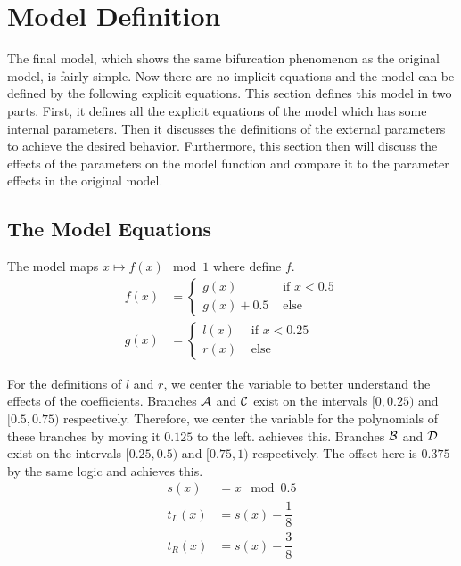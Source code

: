 \section{Model Definition}

The final model, which shows the same bifurcation phenomenon as the original model, is fairly simple.
Now there are no implicit equations and the model can be defined by the following explicit equations.
This section defines this model in two parts.
First, it defines all the explicit equations of the model which has some internal parameters.
Then it discusses the definitions of the external parameters to achieve the desired behavior.
Furthermore, this section then will discuss the effects of the parameters on the model function and compare it to the parameter effects in the original model.

\subsection{The Model Equations}

The model maps $x \mapsto f(x) \mod 1$ where  define $f$.
\begin{align}
    f(x) & = \begin{cases}
                 g(x)       & \text{ if } x < 0.5 \\
                 g(x) + 0.5 & \text{ else}
             \end{cases}
    \label{equ:final.def.f}
    \\
    g(x) & = \begin{cases}
                 l(x) & \text{ if } x < 0.25 \\
                 r(x) & \text{ else}
             \end{cases}
\end{align}

For the definitions of $l$ and $r$, we center the variable to better understand the effects of the coefficients.
Branches $\mathcal{A}$ and $\mathcal{C}$ exist on the intervals $[0, 0.25)$ and $[0.5, 0.75)$ respectively.
Therefore, we center the variable for the polynomials of these branches by moving it $0.125$ to the left.
 achieves this.
Branches $\mathcal{B}$ and $\mathcal{D}$ exist on the intervals $[0.25, 0.5)$ and $[0.75, 1)$ respectively.
The offset here is $0.375$ by the same logic and  achieves this.
\begin{align}
    s(x)   & = x \mod 0.5                                   \\
    t_L(x) & = s(x) - \dfrac{1}{8} \label{equ:final.def.tl} \\
    t_R(x) & = s(x) - \dfrac{3}{8} \label{equ:final.def.tr}
\end{align}

